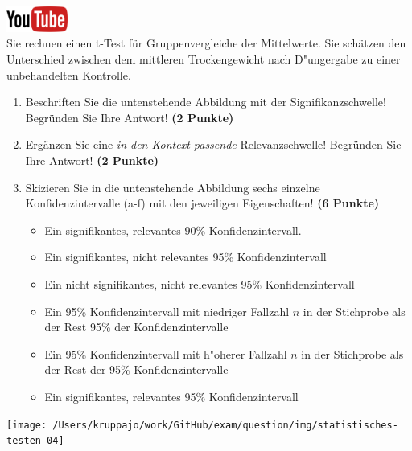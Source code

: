 \documentclass[a4paper, 9pt]{scrartcl}\usepackage[]{graphicx}\usepackage[]{xcolor}
\begin{document}
\hfill\href{https://youtu.be/CN_O4fYPbhs}{\includegraphics[width =
  2cm]{img/youtube}}\\[1Ex]



Sie rechnen einen t-Test f{\"u}r Gruppenvergleiche der Mittelwerte. Sie
sch{\"a}tzen den Unterschied zwischen dem mittleren Trockengewicht nach D{"u}ngergabe zu einer unbehandelten
Kontrolle.

\begin{enumerate}
\item Beschriften Sie die untenstehende Abbildung mit der
  Signifikanzschwelle! Begr{\"u}nden Sie Ihre Antwort! \textbf{(2 Punkte)}
\item Erg{\"a}nzen Sie eine \textit{in den Kontext passende} Relevanzschwelle!
  Begr{\"u}nden Sie Ihre Antwort! \textbf{(2 Punkte)} 
\item Skizieren Sie in die
  untenstehende Abbildung sechs einzelne Konfidenzintervalle (a-f) mit den
  jeweiligen Eigenschaften! \textbf{(6 Punkte)}
  \begin{itemize}
  \item[(a)] Ein signifikantes, relevantes 90\% Konfidenzintervall. 	
  \item[(b)] Ein signifikantes, nicht relevantes 95\% Konfidenzintervall 	
  \item[(c)] Ein nicht signifikantes, nicht relevantes 95\% Konfidenzintervall 	
  \item[(d)] Ein 95\% Konfidenzintervall mit niedriger Fallzahl $n$ in der Stichprobe als der Rest 95\% der Konfidenzintervalle 
  \item[(e)] Ein 95\% Konfidenzintervall mit h{"o}herer Fallzahl $n$ in der Stichprobe als der Rest der 95\% Konfidenzintervalle
  \item[(f)] Ein signifikantes, relevantes 95\% Konfidenzintervall
  \end{itemize}
\end{enumerate}

\begin{center}
  \texttt{[image: /Users/kruppajo/work/GitHub/exam/question/img/statistisches-testen-04]}
\end{center}
\end{document}
